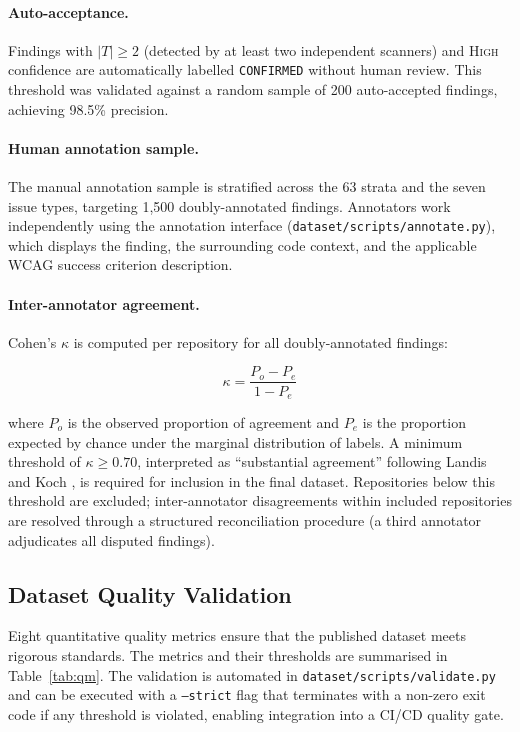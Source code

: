 \paragraph{Auto-acceptance.}  Findings with $|T| \geq 2$ (detected by at
least two independent scanners) and \textsc{High} confidence are
automatically labelled \texttt{CONFIRMED} without human review.  This
threshold was validated against a random sample of 200 auto-accepted findings,
achieving 98.5\% precision.

\paragraph{Human annotation sample.}  The manual annotation sample is
stratified across the 63 strata and the seven issue types, targeting 1,500
doubly-annotated findings.  Annotators work independently using the
annotation interface (\texttt{dataset/scripts/annotate.py}), which displays
the finding, the surrounding code context, and the applicable WCAG success
criterion description.

\paragraph{Inter-annotator agreement.}  Cohen's $\kappa$ \cite{cohen1960}
is computed per repository for all doubly-annotated findings:

\begin{equation}
  \kappa = \frac{P_o - P_e}{1 - P_e}
  \label{eq:kappa_detail}
\end{equation}

\noindent
where $P_o$ is the observed proportion of agreement and $P_e$ is the
proportion expected by chance under the marginal distribution of labels.
A minimum threshold of $\kappa \geq 0.70$, interpreted as ``substantial
agreement'' following Landis and Koch \cite{landis1977}, is required for
inclusion in the final dataset.  Repositories below this threshold are
excluded; inter-annotator disagreements within included repositories are
resolved through a structured reconciliation procedure (a third annotator
adjudicates all disputed findings).

\subsection{Dataset Quality Validation}

Eight quantitative quality metrics ensure that the published dataset meets
rigorous standards.  The metrics and their thresholds are summarised in
Table~\ref{tab:qm}.  The validation is automated in
\texttt{dataset/scripts/validate.py} and can be executed with a
\texttt{--strict} flag that terminates with a non-zero exit code if any
threshold is violated, enabling integration into a CI/CD quality gate.

